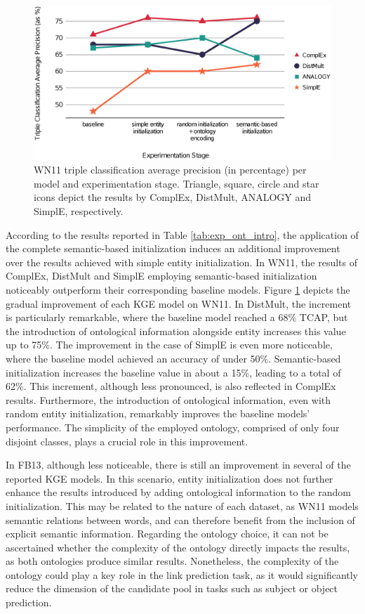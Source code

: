 \begin{figure}[t]
    \centering
    \includegraphics[width=.9\linewidth]{4_kbsintegrationdl/figures/WN_Comparison.eps}
    \caption{WN11 triple classification average precision (in percentage) per model and experimentation stage. Triangle, square, circle and star icons depict the results by ComplEx, DistMult, ANALOGY and SimplE, respectively. }
    \label{fig:wn_stage_comparison}
\end{figure}

According to the results reported in Table \ref{tab:exp_ont_intro}, the application of the complete semantic-based initialization induces an additional improvement over the results achieved with simple entity initialization. In WN11, the results of ComplEx, DistMult and SimplE employing semantic-based initialization noticeably outperform their corresponding baseline models. Figure \ref{fig:wn_stage_comparison} depicts the gradual improvement of each KGE model on WN11. In DistMult, the increment is particularly remarkable, where the baseline model reached a 68\% TCAP, but the introduction of ontological information alongside entity increases this value up to 75\%. The improvement in the case of SimplE is even more noticeable, where the baseline model achieved an accuracy of under 50\%. Semantic-based initialization increases the baseline value in about a 15\%, leading to a total of 62\%. This increment, although less pronounced, is also reflected in ComplEx results. Furthermore, the introduction of ontological information, even with random entity initialization, remarkably improves the baseline models' performance. The simplicity of the employed ontology, comprised of only four disjoint classes, plays a crucial role in this improvement. 

In FB13, although less noticeable, there is still an improvement in several of the reported KGE models. In this scenario, entity initialization does not further enhance the results introduced by adding ontological information to the random initialization. This may be related to the nature of each dataset, as WN11 models semantic relations between words, and can therefore benefit from the inclusion of explicit semantic information. Regarding the ontology choice, it can not be ascertained whether the complexity of the ontology directly impacts the results, as both ontologies produce similar results. Nonetheless, the complexity of the ontology could play a key role in the link prediction task, as it would significantly reduce the dimension of the candidate pool in tasks such as subject or object prediction.


